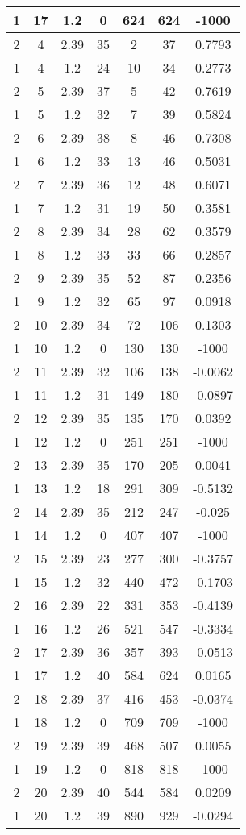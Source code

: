 \documentclass[letterpaper, 12pt]{article}
\begin{document}
\begin{longtable}{|c|c|c|c|c|c|c|}
\hline
1 & 17 & 1.2 & 0 & 624 & 624 & -1000 \\
\hline
2 & 4 & 2.39 & 35 & 2 & 37 & 0.7793 \\
\hline
1 & 4 & 1.2 & 24 & 10 & 34 & 0.2773 \\
\hline
2 & 5 & 2.39 & 37 & 5 & 42 & 0.7619 \\
\hline
1 & 5 & 1.2 & 32 & 7 & 39 & 0.5824 \\
\hline
2 & 6 & 2.39 & 38 & 8 & 46 & 0.7308 \\
\hline
1 & 6 & 1.2 & 33 & 13 & 46 & 0.5031 \\
\hline
2 & 7 & 2.39 & 36 & 12 & 48 & 0.6071 \\
\hline
1 & 7 & 1.2 & 31 & 19 & 50 & 0.3581 \\
\hline
2 & 8 & 2.39 & 34 & 28 & 62 & 0.3579 \\
\hline
1 & 8 & 1.2 & 33 & 33 & 66 & 0.2857 \\
\hline
2 & 9 & 2.39 & 35 & 52 & 87 & 0.2356 \\
\hline
1 & 9 & 1.2 & 32 & 65 & 97 & 0.0918 \\
\hline
2 & 10 & 2.39 & 34 & 72 & 106 & 0.1303 \\
\hline
1 & 10 & 1.2 & 0 & 130 & 130 & -1000 \\
\hline
2 & 11 & 2.39 & 32 & 106 & 138 & -0.0062 \\
\hline
1 & 11 & 1.2 & 31 & 149 & 180 & -0.0897 \\
\hline
2 & 12 & 2.39 & 35 & 135 & 170 & 0.0392 \\
\hline
1 & 12 & 1.2 & 0 & 251 & 251 & -1000 \\
\hline
2 & 13 & 2.39 & 35 & 170 & 205 & 0.0041 \\
\hline
1 & 13 & 1.2 & 18 & 291 & 309 & -0.5132 \\
\hline
2 & 14 & 2.39 & 35 & 212 & 247 & -0.025 \\
\hline
1 & 14 & 1.2 & 0 & 407 & 407 & -1000 \\
\hline
2 & 15 & 2.39 & 23 & 277 & 300 & -0.3757 \\
\hline
1 & 15 & 1.2 & 32 & 440 & 472 & -0.1703 \\
\hline
2 & 16 & 2.39 & 22 & 331 & 353 & -0.4139 \\
\hline
1 & 16 & 1.2 & 26 & 521 & 547 & -0.3334 \\
\hline
2 & 17 & 2.39 & 36 & 357 & 393 & -0.0513 \\
\hline
1 & 17 & 1.2 & 40 & 584 & 624 & 0.0165 \\
\hline
2 & 18 & 2.39 & 37 & 416 & 453 & -0.0374 \\
\hline
1 & 18 & 1.2 & 0 & 709 & 709 & -1000 \\
\hline
2 & 19 & 2.39 & 39 & 468 & 507 & 0.0055 \\
\hline
1 & 19 & 1.2 & 0 & 818 & 818 & -1000 \\
\hline
2 & 20 & 2.39 & 40 & 544 & 584 & 0.0209 \\
\hline
1 & 20 & 1.2 & 39 & 890 & 929 & -0.0294 \\
\hline
\end{longtable}
\end{document}
